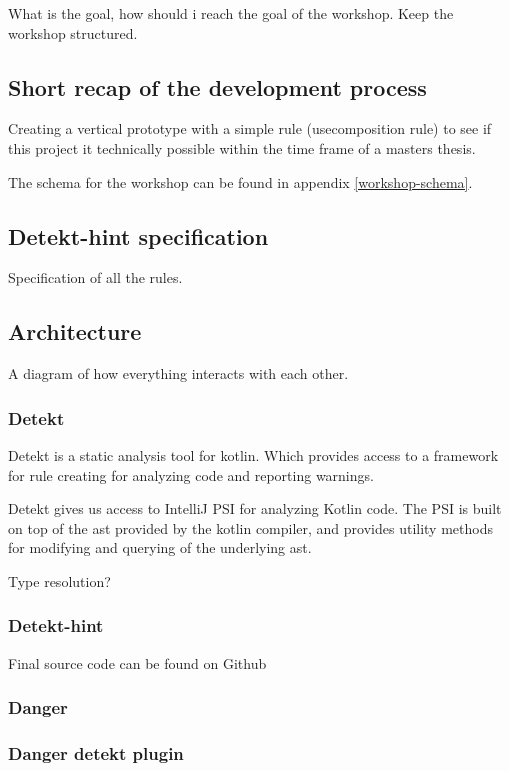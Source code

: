 \documentclass{article}
\begin{document}
What is the goal, how should i reach the goal of the workshop. Keep the workshop structured.


\subsection{Short recap of the development process}
Creating a vertical prototype with a simple rule (usecomposition rule) to see if this project it technically possible within the time frame of a masters thesis. 

The schema for the workshop can be found in appendix \ref{workshop-schema}.


\subsection{Detekt-hint specification}
Specification of all the rules.

\subsection{Architecture}
A diagram of how everything interacts with each other.

\subsubsection{Detekt}
Detekt is a static analysis tool for kotlin. Which provides access to a framework for rule creating for analyzing code and reporting warnings.

Detekt gives us access to IntelliJ PSI for analyzing Kotlin code. The PSI is built on top of the \gls{ast} provided by the kotlin compiler, and provides utility methods for modifying and querying of the underlying \gls{ast}.

Type resolution?

\subsubsection{Detekt-hint}
Final source code can be found on Github\cite{detekt-hint-repository}

\subsubsection{Danger}

\subsubsection{Danger detekt plugin}
\end{document}
